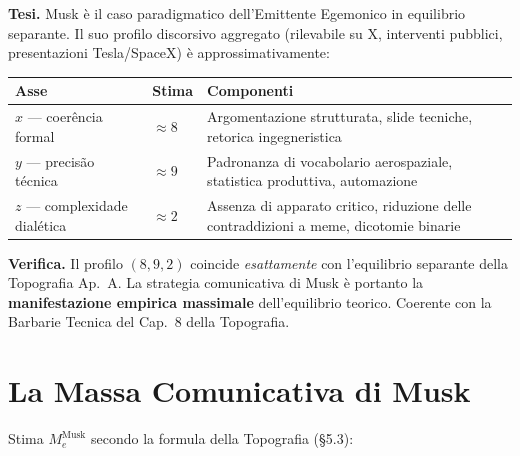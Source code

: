 \Hypoth{} \textbf{Tesi.} Musk è il caso paradigmatico dell'Emittente
Egemonico in equilibrio separante. Il suo profilo discorsivo aggregato
(rilevabile su X, interventi pubblici, presentazioni Tesla/SpaceX) è
approssimativamente:

{\def\LTcaptype{none} %
{\small\begin{longtable}[]{@{}
  >{\raggedright\arraybackslash}p{}
  >{\raggedright\arraybackslash}p{}
  >{\raggedright\arraybackslash}p{}@{}}
\toprule\noalign{}
\begin{minipage}[b]{\linewidth}\raggedright
Asse
\end{minipage} & \begin{minipage}[b]{\linewidth}\raggedright
Stima
\end{minipage} & \begin{minipage}[b]{\linewidth}\raggedright
Componenti
\end{minipage} \\
\midrule\noalign{}
\endhead
\bottomrule\noalign{}
\endlastfoot
\(x\) --- coerência formal & \(\approx 8\) & Argomentazione strutturata,
slide tecniche, retorica ingegneristica \\
\(y\) --- precisão técnica & \(\approx 9\) & Padronanza di vocabolario
aerospaziale, statistica produttiva, automazione \\
\(z\) --- complexidade dialética & \(\approx 2\) & Assenza di apparato
critico, riduzione delle contraddizioni a meme, dicotomie binarie \\
\end{longtable}}
}

\Proved{} \textbf{Verifica.} Il profilo \((8, 9, 2)\) coincide
\emph{esattamente} con l'equilibrio separante della Topografia Ap.~A.
La strategia comunicativa di Musk è portanto la \textbf{manifestazione
empirica massimale} dell'equilibrio teorico. Coerente con la Barbarie
Tecnica del Cap.~8 della Topografia.



\section{La Massa Comunicativa di
Musk}\label{la-massa-comunicativa-di-musk}

Stima \(M_e^{\text{Musk}}\) secondo la formula della Topografia (\S{}5.3):


